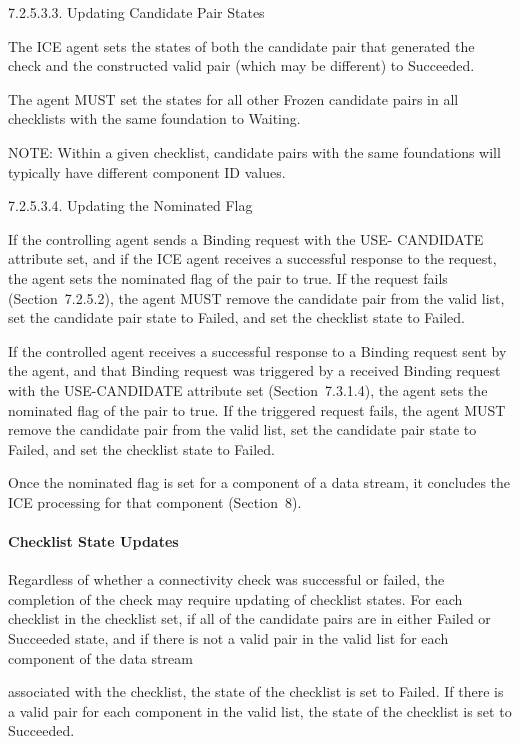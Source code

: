 \documentclass{article}
\begin{document}
7.2.5.3.3.  Updating Candidate Pair States

The ICE agent sets the states of both the candidate pair that generated the check and the constructed valid pair (which may be different) to Succeeded.

The agent MUST set the states for all other Frozen candidate pairs in all checklists with the same foundation to Waiting.

NOTE: Within a given checklist, candidate pairs with the same foundations will typically have different component ID values.

7.2.5.3.4.  Updating the Nominated Flag

If the controlling agent sends a Binding request with the USE- CANDIDATE attribute set, and if the ICE agent receives a successful response to the request, the agent sets the nominated flag of the pair to true.  If the request fails (Section~7.2.5.2), the agent MUST remove the candidate pair from the valid list, set the candidate pair state to Failed, and set the checklist state to Failed.

If the controlled agent receives a successful response to a Binding request sent by the agent, and that Binding request was triggered by a received Binding request with the USE-CANDIDATE attribute set (Section~7.3.1.4), the agent sets the nominated flag of the pair to true.  If the triggered request fails, the agent MUST remove the candidate pair from the valid list, set the candidate pair state to Failed, and set the checklist state to Failed.

Once the nominated flag is set for a component of a data stream, it concludes the ICE processing for that component (Section~8).

\paragraph{Checklist State Updates}

Regardless of whether a connectivity check was successful or failed, the completion of the check may require updating of checklist states. For each checklist in the checklist set, if all of the candidate pairs are in either Failed or Succeeded state, and if there is not a valid pair in the valid list for each component of the data stream

associated with the checklist, the state of the checklist is set to Failed.  If there is a valid pair for each component in the valid list, the state of the checklist is set to Succeeded.
\end{document}
